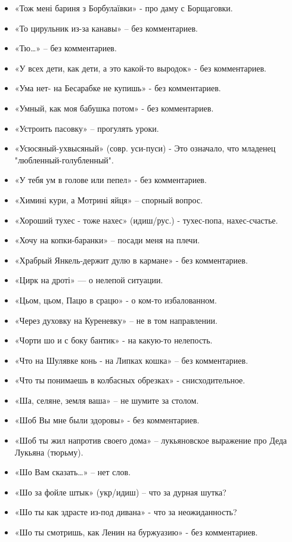 \begin{itemize}
\item  «Тож мені бариня з Борбулаївки» - про даму с Борщаговки.
\item  «То цирульник из-за канавы» – без комментариев.
\item  «Тю…» – без комментариев.
\item  «У всех дети, как дети, а это какой-то выродок» - без комментариев.
\item  «Ума нет- на Бесарабке не купишь» - без комментариев.
\item  «Умный, как моя бабушка потом» - без комментариев.
\item  «Устроить пасовку» – прогулять уроки.
\item  «Усюсяный-ухвысяный» (совр. уси-пуси) - Это означало, что младенец "любленный-голубленный".
\item  «У тебя ум в голове или пепел» - без комментариев.
\item  «Химині кури, а Мотрині яйця» – спорный вопрос.
\item  «Хороший тухес - тоже нахес» (идиш/рус.) - тухес-попа, нахес-счастье. 
\item  «Хочу на копки-баранки» – посади меня на плечи.
\item  «Храбрый  Янкель-держит дулю в кармане» - без комментариев.
\item  «Цирк на дроті» — о нелепой ситуации.
\item  «Цьом, цьом, Пацю в срацю»  - о ком-то избалованном.
\item  «Через духовку на Куреневку» – не в том направлении.
\item  «Чорти шо и с боку бантик» - на какую-то нелепость.
\item  «Что на Шулявке конь - на Липках кошка» – без комментариев.
\item  «Что ты понимаешь в колбасных обрезках» - снисходительное.
\item  «Ша, селяне, земля ваша» – не шумите за столом.
\item  «Шоб Вы мне были здоровы» - без комментариев.
\item  «Шоб ты жил напротив своего дома» – лукьяновское выражение про Деда Лукьяна (тюрьму).
\item  «Шо Вам сказать…» – нет слов.
\item  «Шо за фойле штык» (укр/идиш) – что за дурная шутка?
\item  «Шо ты как здрасте из-под дивана» - что за неожиданность?
\item  «Шо ты смотришь, как Ленин на буржуазию» - без комментариев.

\end{itemize}
